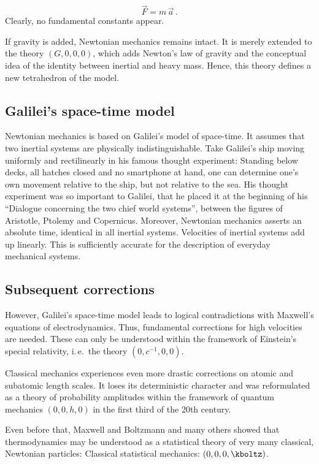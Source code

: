 \documentclass{scrartcl}
\begin{document}
\begin{equation*}
  \vec{F} =m\, \vec{a}\,.
\end{equation*}
%
Clearly, no fundamental constants appear.

If gravity is added, Newtonian mechanics remains intact. It is merely extended to the theory $(G,0,0,0)$, which adds Newton's law of gravity and the conceptual idea of the identity between inertial and heavy mass. Hence, this theory defines a new tetrahedron of the model.


\subsection*{Galilei's space-time model}

Newtonian mechanics is based on Galilei's model of space-time. It assumes that two inertial systems are physically indistinguishable. Take Galilei's ship moving uniformly and rectilinearly in his famous thought experiment: Standing below decks, all hatches closed and no smartphone at hand, one can determine one's own movement relative to the ship, but not relative to the sea. His thought experiment was so important to Galilei, that he placed it at the beginning of his \enquote{Dialogue concerning the two chief world systems}, between the figures of Aristotle, Ptolemy and Copernicus. Moreover, Newtonian mechanics asserts an absolute time, identical in all inertial systems. Velocities of inertial systems add up linearly. This is sufficiently accurate for the description of everyday mechanical systems.


\subsection*{Subsequent corrections}

However, Galilei's space-time model leads to logical contradictions with Maxwell's equations of electrodynamics. Thus, fundamental corrections for high velocities are needed. These can only be understood within the framework of Einstein's special relativity, i.\,e.\ the theory $(0,c^{−1},0,0)$.

Classical mechanics experiences even more drastic corrections on atomic and subatomic length scales. It loses its deterministic character and was reformulated as a theory of probability amplitudes within the framework of quantum mechanics $(0,0,h,0)$ in the first third of the 20th century.

Even before that, Maxwell and Boltzmann and many others showed that thermodynamics may be understood as a statistical theory of very many classical, Newtonian particles: Classical statistical mechanics: $(0,0,0,\kboltz)$.
\end{document}

